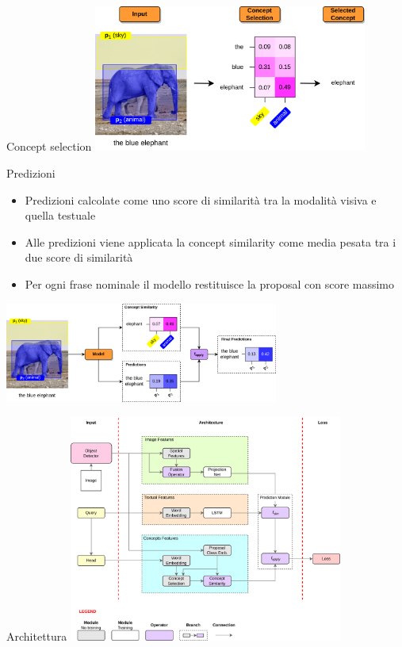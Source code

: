 \documentclass{beamer}
\begin{document}
\begin{frame}{Concept selection}
  \centering
  \includegraphics[width=9cm]{images/concept-selection-example.png}
\end{frame}

\begin{frame}{Predizioni}
  \begin{itemize}
    \item Predizioni calcolate come uno \alert{score di similarità}
    tra la modalità visiva e quella testuale
    \item Alle predizioni viene applicata la concept similarity come
    \alert{media pesata} tra i due score di similarità
    \item Per ogni frase nominale il modello restituisce la
    \alert{proposal con score massimo}
  \end{itemize}

  \vspace{0.5cm}

  \centering
  \includegraphics[width=9cm]{images/predictions.png}
\end{frame}

\begin{frame}{Architettura}
  \centering
  \includegraphics[width=9cm]{images/model-architecture.png}
\end{frame}
\end{document}
